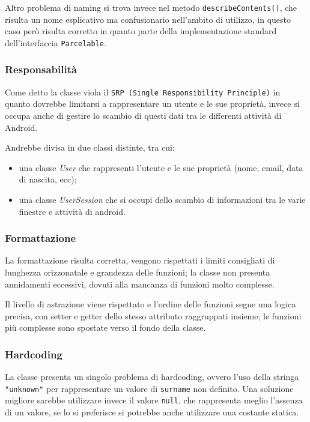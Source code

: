         Altro problema di naming si trova invece nel metodo \texttt{describeContents()}, che risulta un nome esplicativo ma confusionario nell'ambito di utilizzo,
        in questo caso però risulta corretto in quanto parte della implementazione standard dell'interfaccia \texttt{Parcelable}.

        \subsubsection{Responsabilità}
        Come detto la classe viola il \texttt{SRP (Single Responsibility Principle)} in quanto dovrebbe limitarsi a rappresentare un utente e le sue proprietà,
        invece si occupa anche di gestire lo scambio di questi dati tra le differenti attività di Android.

        Andrebbe divisa in due classi distinte, tra cui:
        \begin{itemize}
            \item una classe \textit{User} che rappresenti l'utente e le sue proprietà (nome, email, data di nascita, ecc);
            \item una classe \textit{UserSession} che si occupi dello scambio di informazioni tra le varie finestre e attività di android.
        \end{itemize}
      
        \subsubsection{Formattazione}
        La formattazione risulta corretta, vengono rispettati i limiti consigliati di lunghezza orizzonatale e grandezza delle funzioni; la classe non presenta annidamenti eccessivi, dovuti alla
        mancanza di funzioni molto complesse.

        Il livello di astrazione viene rispettato e l'ordine delle funzioni segue una logica precisa, con setter e getter dello stesso attributo raggruppati insieme; le funzioni più complesse sono spostate
        verso il fondo della classe.

        \subsubsection{Hardcoding}
        La classe presenta un singolo problema di hardcoding, ovvero l'uso della stringa \texttt{"unknown"} per rappresentare un valore di \texttt{surname} non definito.
        Una soluzione migliore sarebbe utilizzare invece il valore \texttt{null}, che rappresenta meglio l'assenza di un valore, se lo si preferisce si potrebbe anche utilizzare una costante statica.

